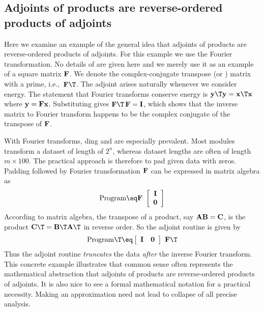 \subsection{Adjoints of products are reverse-ordered products of adjoints}
Here we examine an example of the general idea that
adjoints of products are reverse-ordered products of adjoints.
For this example we use the Fourier transformation.
No details of  are given here
and we merely use it as an example of a square matrix $\bold F$.
We denote the complex-conjugate transpose (or ) matrix
with a prime,
i.e.,~$\bold F\T$.
The adjoint arises naturally whenever we consider energy.
The statement that Fourier transforms conserve energy is 
$\bold y\T\bold y=\bold x\T\bold x$ where $\bold y= \bold F \bold x$.
Substituting gives $\bold F\T\, \bold F = \bold I$, which shows that
the inverse matrix to Fourier transform
happens to be the complex conjugate of the transpose of $\bold F$.
\par
With Fourier transforms,
ding and  are especially prevalent.
Most modules transform a dataset of length of $2^n$,
whereas dataset lengths are often of length $m \times 100$.
The practical approach is therefore to pad given data with zeros.
Padding followed by Fourier transformation $\bold F$
can be expressed in matrix algebra as
\begin{equation}
{\rm Program} \eq
\bold F \ 
 \left[ 
  \begin{array}{c}
   \bold I \\ 
   \bold 0
  \end{array}
 \right] 
\end{equation}
According to matrix algebra, the transpose of a product,
say $\bold A \bold B = \bold C$,
is the product $\bold C\T = \bold B\T \bold A\T$ in reverse order.
So the adjoint routine is given by
\begin{equation}
{\rm Program}\T \eq
 \left[ 
  \begin{array}{cc}
   \bold I & \bold 0
  \end{array}
 \right] 
\
\bold F\T
\end{equation}
Thus the adjoint routine
{\em  truncates} the data {\em  after} the inverse Fourier transform.
This concrete example illustrates that common sense often represents
the mathematical abstraction
that adjoints of products are reverse-ordered products of adjoints.
It is also nice to see a formal mathematical notation
for a practical necessity.
Making an approximation need not lead to collapse of all precise analysis.


